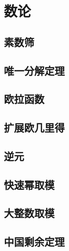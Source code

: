 \section{数论}
\subsection{素数筛}


\subsection{唯一分解定理}


\subsection{欧拉函数}


\subsection{扩展欧几里得}


\subsection{逆元}


\subsection{快速幂取模}


\subsection{大整数取模}


\subsection{中国剩余定理}

